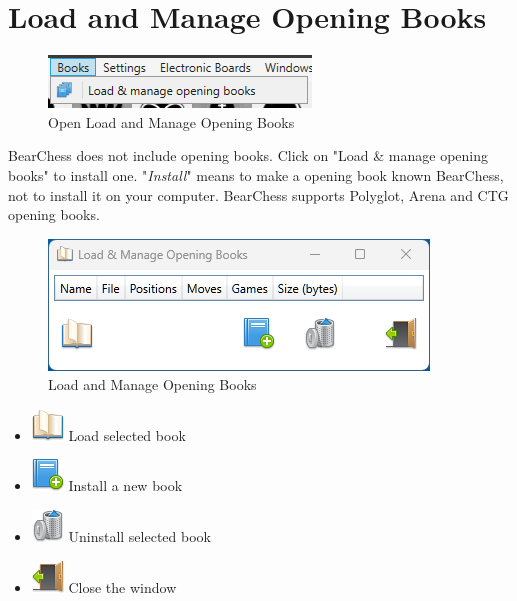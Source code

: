 \documentclass[11pt,a4paper]{article}
\begin{document}
	\section{Load and Manage Opening Books} \label{OpeningBooks}
	
	\begin{figure}[H]
		\centering
		\includegraphics[scale=1.0]{books.png}
		\caption{Open Load and Manage Opening Books  }
		\label{fig:LoadManageBooks1}
	\end{figure}
	
	BearChess does not include opening books. Click on "Load \& manage opening books" to install one. "\textit{Install}" means to make a opening book known BearChess, not to install it on your computer. BearChess supports Polyglot, Arena and CTG opening books.\\
	
	\begin{figure}[H]
		\centering
		\includegraphics[scale=1.0]{LoadManageBooks2.png}
		\caption{Load and Manage Opening Books  }
		\label{fig:LoadManageBooks2}
	\end{figure}
	
	\begin{itemize}
		\item \includegraphics[scale=0.5]{book_open.png} Load selected book
		\item \includegraphics[scale=0.5]{book_add.png} Install a new book
		\item \includegraphics[scale=0.5]{bin.png} Uninstall selected book
		\item \includegraphics[scale=0.5]{door_out.png} Close the window
	\end{itemize}
	
\end{document}
